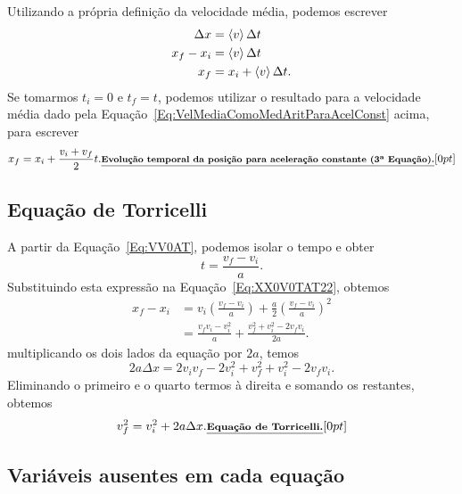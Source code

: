 Utilizando a própria definição da velocidade média, podemos escrever
\begin{align}
    \Delta x &= \left\langle{v}\right\rangle \Delta t \\
    x_f - x_i &= \left\langle{v}\right\rangle \Delta t \\
    x_f &= x_i + \left\langle{v}\right\rangle \Delta t.
\end{align}
%
Se tomarmos $t_i = 0$ e $t_f = t$, podemos utilizar o resultado para a velocidade média dado pela Equação~\eqref{Eq:VelMediaComoMedAritParaAcelConst} acima, para escrever
\begin{equation}
  x_f = x_i + \frac{v_i + v_f}{2} t.\mathnote{Evolução temporal da posição para aceleração constante (3\textordfeminine~Equação).}
\end{equation}

\subsection{Equação de Torricelli}

A partir da Equação~\ref{Eq:VV0AT}, podemos isolar o tempo e obter
\begin{equation}
  t = \frac{v_f-v_i}{a}.
\end{equation}
%
Substituindo esta expressão na Equação~\ref{Eq:XX0V0TAT22}, obtemos
\begin{align}
  x_f - x_i &= v_i \left(\frac{v_f-v_i}{a}\right) + \frac{a}{2} \left(\frac{v_f-v_i}{a}\right)^2 \\
  &= \frac{v_f v_i - v_i^2}{a} + \frac{v_f^2 + v_i^2-2v_fv_i}{2a}.
\end{align}
%
multiplicando os dois lados da equação por $2a$, temos
\begin{equation}
  2a\Delta x = 2v_i v_f - 2v_i^2 + v_f^2 +v_i^2 - 2v_f v_i.
\end{equation}
%
Eliminando o primeiro e o quarto termos à direita e somando os restantes, obtemos
\begin{equation}
  v_f^2 = v_i^2 + 2 a \Delta x. \relax{\footnotesize\emph{\textbf{Equação de Torricelli.}}}[0pt]
\end{equation}

\subsection{Variáveis ausentes em cada equação}

